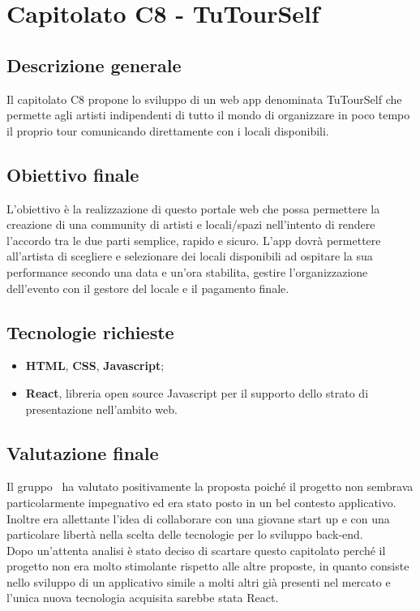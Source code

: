 \documentclass[StudioDiFattibilità.tex]{subfiles}
\begin{document}
\chapter{Capitolato C8 - TuTourSelf}
\section{Descrizione generale}
Il capitolato C8 propone lo sviluppo di un web app denominata TuTourSelf che permette agli artisti indipendenti di tutto il mondo di organizzare in poco tempo il proprio tour comunicando direttamente con i locali disponibili.
\section{Obiettivo finale}
L’obiettivo è la realizzazione di questo portale web che possa permettere la creazione di una community di artisti e locali/spazi nell’intento di rendere l’accordo tra le due parti semplice, rapido e sicuro. L’app dovrà permettere all’artista di scegliere e selezionare dei locali disponibili ad ospitare la sua performance secondo una data e un’ora stabilita, gestire l’organizzazione dell’evento con il gestore del locale e il pagamento finale.
\section{Tecnologie richieste}
\begin{itemize}
	\item \textbf{HTML}, \textbf{CSS}, \textbf{Javascript};
	\item \textbf{React}, libreria open source Javascript per il supporto dello strato di presentazione nell'ambito web.
\end{itemize}
\section{Valutazione finale}
Il gruppo \gruppo\ ha valutato positivamente la proposta poiché il progetto non sembrava particolarmente impegnativo ed era stato posto in un bel contesto applicativo. Inoltre era allettante l’idea di collaborare con una giovane start up e con una particolare libertà nella scelta delle tecnologie per lo sviluppo back-end.\\
Dopo un’attenta analisi è stato deciso di scartare questo capitolato perché il progetto non era molto stimolante rispetto alle altre proposte, in quanto consiste nello sviluppo di un applicativo simile a molti altri già presenti nel mercato e l’unica nuova tecnologia acquisita sarebbe stata React.
\end{document}
